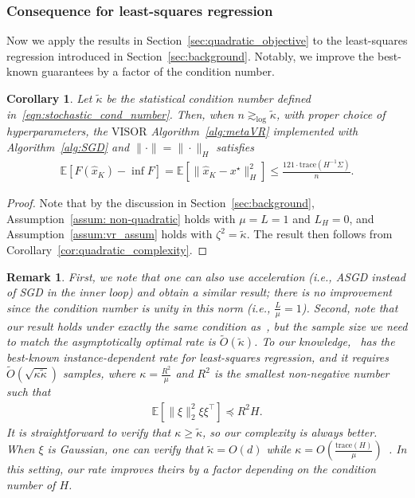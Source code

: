 \documentclass[11pt,twoside]{article}
\numberwithin{equation}{section}
\newcommand{\EE}{\mathbb{E}}
\newcommand{\trace}[1]{\mathrm{trace}\left(#1\right)}
\newcommand{\1}{\mathbf{1}}
\newtheorem{corollary}[theorem]{Corollary}
\newtheorem{remark}{Remark}
\theoremstyle{remark}
\theoremstyle{plain}
\newcommand{\liph}{L_H}
\newcommand{\algname}{\mathrm{VISOR}}
\begin{document}
\subsubsection{Consequence for least-squares regression}\label{sec:improve_least_squares}
Now we apply the results in Section~\ref{sec:quadratic_objective} to the least-squares regression introduced in Section~\ref{sec:background}. Notably, we improve the best-known guarantees by a factor of the condition number.
\begin{corollary}
Let $\tilde \kappa$ be the statistical condition number defined in~\eqref{eqn:stochastic_cond_number}. Then, when $n  \gtrsim_{\log} \tilde \kappa$, with proper choice of hyperparameters, the $\algname$ Algorithm~\ref{alg:metaVR} implemented with Algorithm~\ref{alg:SGD} and $\|\cdot\| = \|\cdot\|_H$ satisfies
\begin{align*}
	\EE[F(\widehat x_K) - \inf F]  = \EE[\|\widehat x_K - x^\star\|_H^2] \le \frac{121\cdot \trace{H^{-1}\Sigma}}{n}.
\end{align*}
\end{corollary}
\begin{proof}
Note  that by the discussion in Section~\ref{sec:background}, Assumption~\ref{assum: non-quadratic} holds with $\mu = L = 1$ and $\liph = 0$, and Assumption~\ref{assum:vr_assum} holds with $\zeta^2 = \tilde \kappa$. The result then follows from Corollary~\ref{cor:quadratic_complexity}.
\end{proof}
\begin{remark}
First, we note that one can also use acceleration (i.e., ASGD instead of SGD in the inner loop) and obtain a similar result; there is no improvement since the condition number is unity in this norm (i.e., $\frac{L}{\mu} =1$). Second, note that our result holds under exactly the same condition as~\cite{jain2018accelerating}, but the sample size we need to match the asymptotically optimal rate is $\tilde O(\tilde \kappa)$. To our knowledge,~\cite[Corollary 2]{jain2018accelerating} has the best-known instance-dependent rate for least-squares regression, and it requires $\tilde O(\sqrt{\kappa \tilde \kappa})$ samples, where $\kappa = \frac{R^2}{\mu}$ and $R^2$ is the smallest non-negative number such that 
\begin{align*}
	\EE[\|\xi\|_2^2 \xi \xi^\top] \preceq R^2 H.
\end{align*}
It is straightforward to verify that $\kappa \ge \tilde \kappa$, so our complexity is always better. When $\xi$ is Gaussian,  one can verify that $\tilde \kappa = O(d)$ while $\kappa = O(\frac{\trace{H}}{\mu})$~\cite{jain2018accelerating}. In this setting, our rate improves theirs by a factor depending on the condition number of $H$.
\end{remark}
\end{document}

